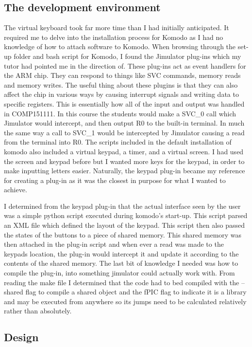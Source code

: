 \subsection{The development environment}
The virtual keyboard took far more time than I had initially anticipated. It required me to delve into the installation process for Komodo as I had no knowledge of how to attach software to Komodo. When browsing through the set-up folder and bash script for Komodo, I found the Jimulator plug-ins which my tutor had pointed me in the direction of. These plug-ins act as event handlers for the ARM chip. They can respond to things like SVC commands, memory reads and memory writes. The useful thing about these plugins is that they can also affect the chip in various ways by causing interrupt signals and writing data to specific registers. This is essentially how all of the input and output was handled in COMP151111. In this course the students would make a SVC\_0 call which Jimulator would intercept, and then output R0 to the built-in terminal. In much the same way a call to SVC\_1 would be intercepted by Jimulator causing a read from the terminal into R0. The scripts included in the default installation of komodo also included a virtual keypad, a timer, and a virtual screen. I had used the screen and keypad before but I wanted more keys for the keypad, in order to make inputting letters easier. Naturally, the keypad plug-in became my reference for creating a plug-in as it was the closest in purpose for what I wanted to achieve. 

I determined from the keypad plug-in that the actual interface seen by the user was a simple python script executed during komodo's start-up. This script parsed an XML file which defined the layout of the keypad. This script then also passed the states of the buttons to a piece of shared memory. This shared memory was then attached in the plug-in script and when ever a read was made to the keypads location, the plug-in would intercept it and update it according to the contents of the shared memory. The last bit of knowledge I needed was how to compile the plug-in, into something jimulator could actually work with. From reading the make file I determined that the code had to bed compiled with the --shared flag to compile a shared object and the fPIC flag to indicate it is a library and may be executed from anywhere so its jumps need to be calculated relatively rather than absolutely.
\subsection{Design}
